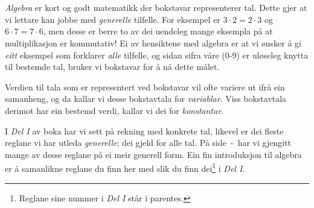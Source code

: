 


\section{\algintro}
\textit{Algebra} er kort og godt matematikk der bokstavar representerer tal. Dette gjer at vi lettare kan jobbe med \textsl{generelle} tilfelle. For eksempel er $ {3\cdot 2=2\cdot3} $ og $ 6\cdot7=7\cdot6 $, men desse er berre to av dei uendeleg mange eksempla på at multiplikasjon er kommutativ! Ei av hensiktene med algebra er at vi ønsker å gi \textsl{eitt} eksempel som forklarer \textsl{alle} tilfelle, og sidan sifra våre (0-9) er uløseleg knytta til bestemde tal, bruker vi bokstavar for å nå dette målet. \vsk

Verdien til tala som er representert ved bokstavar vil ofte variere ut ifrå ein samanheng, og da kallar vi desse bokstavtala for \textit{variablar}. Viss bokstavtala derimot har ein bestemd verdi, kallar vi dei for \textit{konstantar}.

\vsk

I \textsl{Del I} av boka har vi sett på rekning med konkrete tal, likevel er dei fleste reglane vi har utleda \textsl{generelle}; dei gjeld for alle tal. På side \pageref{regstart}\,-\,\pageref{regslutt} har vi gjengitt mange av desse reglane på ei meir generell form. Ein fin introduksjon til algebra er å samanlikne reglane du finn her med slik du finn dei\footnote{Reglane sine nummer i \textsl{Del I} står i parentes.} i \textsl{Del I}. \vsk

\regv
\label{regstart}
\reg[\adkom\;(\ref{adkom}) \label{adkomalg}]{\vs
\[ a+ b =b+a \]
}
\eks{ \vsb
\[ 7+ 5=5+7 \]
} \vsk \vsk

\reg[\gangkom\;(\ref{gangkom})]{\vs
	\[ a\cdot b =b\cdot a \]
}
\eks[1]{ \vsb
	\[ 9\cdot 8=8\cdot9 \]
}
\eks[2]{ \vsb
\[  8\cdot a= a\cdot 8  \]
}
\newpage
{}
\vsk 

\reg[\brdef\;(\ref{brdef})]{
\[ a:b=\frac{a}{b} \]
}
\eks[]{ \vs
\[a:2= \frac{a}{2} \]
}
 \vsk 

\reg[\brtbr\; (\ref{brtbr})]{
\[ \frac{a}{b}\cdot\frac{c}{d}=\frac{a c}{b d} \]
}
\eks[2]{ \vs
	\[ \frac{3}{b}\cdot \frac{a}{7}=\frac{3 a}{7b} \]
}
\newpage
\reg[\brdelmbr\;(\ref{delmbr})]{ 
\[ \frac{a}{b}:\frac{c}{d}=\frac{a}{b}\cdot \frac{d}{c} \]
}
\eks[1]{ \vs
\[ \frac{1}{2}:\frac{5}{7}=\frac{1}{2}\cdot \frac{7}{5} \]
}
 \vsk \vsk

